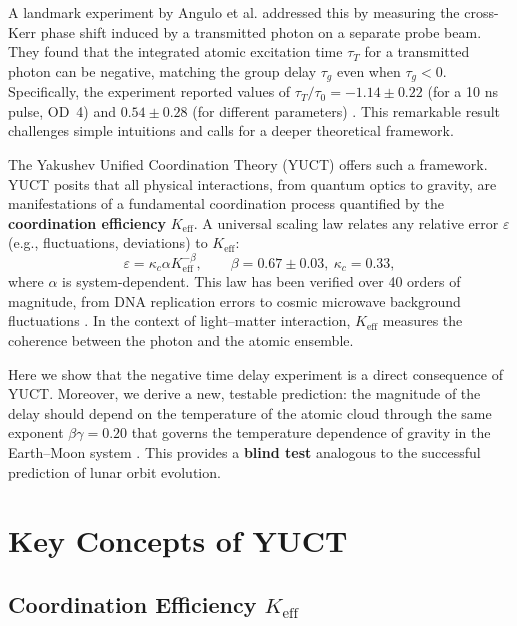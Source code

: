 \documentclass[12pt,a4paper]{article}
\newcommand{\Keff}{K_{\mathrm{eff}}}
\newcommand{\kappac}{\kappa_c}
\newcommand{\eps}{\varepsilon}
\newcommand{\betagamma}{\beta\gamma}
\newcommand{\betac}{\beta}
\begin{document}
	A landmark experiment by Angulo et al. \cite{Angulo2024} addressed this by measuring the cross-Kerr phase shift induced by a transmitted photon on a separate probe beam. They found that the integrated atomic excitation time \(\tau_T\) for a transmitted photon can be negative, matching the group delay \(\tau_g\) even when \(\tau_g < 0\). Specifically, the experiment reported values of \(\tau_T/\tau_0 = -1.14 \pm 0.22\) (for a 10 ns pulse, OD~4) and \(0.54 \pm 0.28\) (for different parameters) \cite{Angulo2024, Nixon2024}. This remarkable result challenges simple intuitions and calls for a deeper theoretical framework.
	
	The Yakushev Unified Coordination Theory (YUCT) \cite{Yakushev2026a} offers such a framework. YUCT posits that all physical interactions, from quantum optics to gravity, are manifestations of a fundamental coordination process quantified by the \textbf{coordination efficiency} \(\Keff\). A universal scaling law relates any relative error \(\eps\) (e.g., fluctuations, deviations) to \(\Keff\):
	\begin{equation}
		\eps = \kappac \alpha \Keff^{-\betac}, \qquad \betac = 0.67 \pm 0.03,\ \kappac = 0.33,
		\label{eq:scaling}
	\end{equation}
	where \(\alpha\) is system-dependent. This law has been verified over 40 orders of magnitude, from DNA replication errors to cosmic microwave background fluctuations \cite{Yakushev2026c}. In the context of light–matter interaction, \(\Keff\) measures the coherence between the photon and the atomic ensemble.
	
	Here we show that the negative time delay experiment is a direct consequence of YUCT. Moreover, we derive a new, testable prediction: the magnitude of the delay should depend on the temperature of the atomic cloud through the same exponent \(\betagamma = 0.20\) that governs the temperature dependence of gravity in the Earth–Moon system \cite{Yakushev2026b}. This provides a \textbf{blind test} analogous to the successful prediction of lunar orbit evolution.
	
	\section{Key Concepts of YUCT}
	
	\subsection{Coordination Efficiency \(\Keff\)}
	
\end{document}
